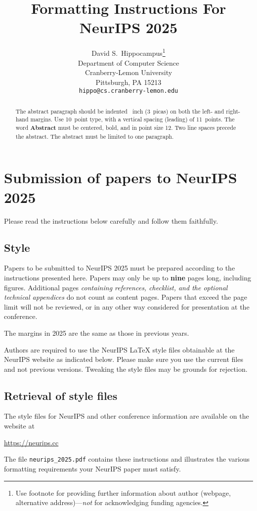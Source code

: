 \documentclass{article}
\title{Formatting Instructions For NeurIPS 2025}
\author{%
  David S.~Hippocampus\thanks{Use footnote for providing further information
    about author (webpage, alternative address)---\emph{not} for acknowledging
    funding agencies.} \\
  Department of Computer Science\\
  Cranberry-Lemon University\\
  Pittsburgh, PA 15213 \\
  \texttt{hippo@cs.cranberry-lemon.edu} \\
}
\begin{document}
\maketitle


\begin{abstract}
  The abstract paragraph should be indented ~inch (3~picas) on
  both the left- and right-hand margins. Use 10~point type, with a vertical
  spacing (leading) of 11~points.  The word \textbf{Abstract} must be centered,
  bold, and in point size 12. Two line spaces precede the abstract. The abstract
  must be limited to one paragraph.
\end{abstract}


\section{Submission of papers to NeurIPS 2025}


Please read the instructions below carefully and follow them faithfully.


\subsection{Style}


Papers to be submitted to NeurIPS 2025 must be prepared according to the
instructions presented here. Papers may only be up to {\bf nine} pages long,
including figures.
Additional pages \emph{containing references, checklist, and the optional technical appendices} do not count as content pages.
Papers that exceed the page limit will not be
reviewed, or in any other way considered for presentation at the conference.


The margins in 2025 are the same as those in previous years.


Authors are required to use the NeurIPS \LaTeX{} style files obtainable at the
NeurIPS website as indicated below. Please make sure you use the current files
and not previous versions. Tweaking the style files may be grounds for
rejection.


\subsection{Retrieval of style files}


The style files for NeurIPS and other conference information are available on
the website at
\begin{center}
  \url{https://neurips.cc}
\end{center}
The file \verb+neurips_2025.pdf+ contains these instructions and illustrates the
various formatting requirements your NeurIPS paper must satisfy.
\end{document}

